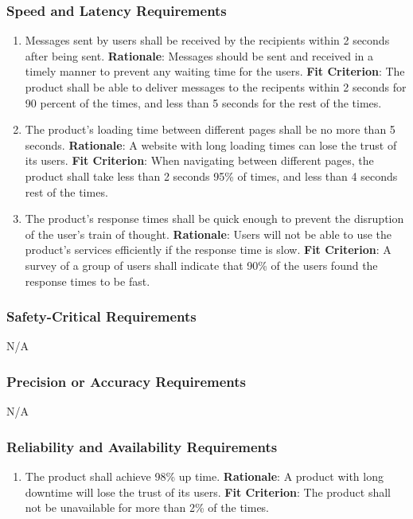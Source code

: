 \documentclass[12pt]{article}
\begin{document}
\subsubsection{Speed and Latency Requirements}
\begin{enumerate}[nfr]
    \item Messages sent by users shall be received by the recipients within 2 seconds after being sent.
    \newline \textbf{Rationale}: Messages should be sent and received in a timely manner to prevent any waiting time for the users.
    \newline \textbf{Fit Criterion}: The product shall be able to deliver messages to the recipents within 2 seconds for 90 percent of the times, and less than 5 seconds for the rest of the times. 

    \item The product's loading time between different pages shall be no more than 5 seconds.
    \newline \textbf{Rationale}: A website with long loading times can lose the trust of its users.
    \newline \textbf{Fit Criterion}: When navigating between different pages, the product shall take less than 2 seconds 95\% of times, and less than 4 seconds rest of the times. 

    \item The product's response times shall be quick enough to prevent the disruption of the user's train of thought.
    \newline \textbf{Rationale}: Users will not be able to use the product's services efficiently if the response time is slow.
    \newline \textbf{Fit Criterion}: A survey of a group of users shall indicate that 90\% of the users found the response times to be fast.
\end{enumerate}

\subsubsection{Safety-Critical Requirements}
N/A
\subsubsection{Precision or Accuracy Requirements}
N/A

\subsubsection{Reliability and Availability Requirements}
\begin{enumerate}[nfr]
    \item The product shall achieve 98\% up time.
    \newline \textbf{Rationale}: A product with long downtime will lose the trust of its users.
    \newline \textbf{Fit Criterion}: The product shall not be unavailable for more than 2\% of the times. 
\end{enumerate}
\end{document}
